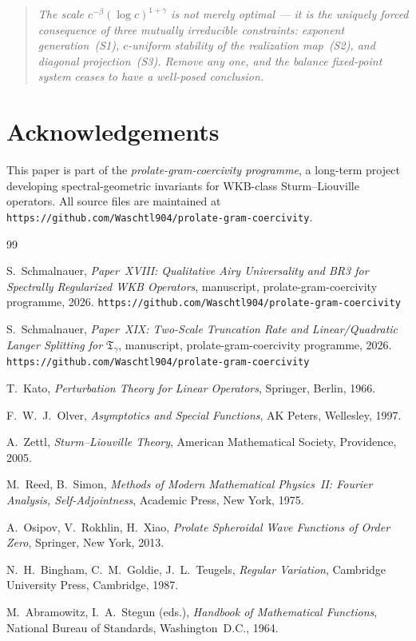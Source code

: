 \documentclass[12pt,a4paper]{amsart}
\theoremstyle{definition}
\begin{document}
\bigskip
\begin{quote}\itshape\large
The scale $c^{-\beta}(\log c)^{1+\gamma}$ is not merely optimal ---
it is the uniquely forced consequence of three mutually irreducible
constraints: exponent generation~(S1),
$c$-uniform stability of the realization map~(S2),
and diagonal projection~(S3).
Remove any one, and the balance fixed-point system
ceases to have a well-posed conclusion.
\end{quote}

\section*{Acknowledgements}

This paper is part of the \textit{prolate-gram-coercivity programme},
a long-term project developing spectral-geometric invariants
for WKB-class Sturm--Liouville operators.
All source files are maintained at
\texttt{https://github.com/Waschtl904/prolate-gram-coercivity}.

\begin{thebibliography}{99}

S.~Schmalnauer,
\textit{Paper~XVIII: Qualitative Airy Universality and BR3 for
Spectrally Regularized WKB Operators},
manuscript, prolate-gram-coercivity programme, 2026.
\texttt{https://github.com/Waschtl904/prolate-gram-coercivity}

S.~Schmalnauer,
\textit{Paper~XIX: Two-Scale Truncation Rate and Linear/Quadratic
Langer Splitting for $\mathfrak{T}_\gamma$},
manuscript, prolate-gram-coercivity programme, 2026.
\texttt{https://github.com/Waschtl904/prolate-gram-coercivity}

T.~Kato,
\textit{Perturbation Theory for Linear Operators},
Springer, Berlin, 1966.

F.~W.~J.~Olver,
\textit{Asymptotics and Special Functions},
AK Peters, Wellesley, 1997.

A.~Zettl,
\textit{Sturm--Liouville Theory},
American Mathematical Society, Providence, 2005.

M.~Reed, B.~Simon,
\textit{Methods of Modern Mathematical Physics~II: Fourier Analysis,
Self-Adjointness},
Academic Press, New York, 1975.

A.~Osipov, V.~Rokhlin, H.~Xiao,
\textit{Prolate Spheroidal Wave Functions of Order Zero},
Springer, New York, 2013.

N.~H.~Bingham, C.~M.~Goldie, J.~L.~Teugels,
\textit{Regular Variation},
Cambridge University Press, Cambridge, 1987.

M.~Abramowitz, I.~A.~Stegun (eds.),
\textit{Handbook of Mathematical Functions},
National Bureau of Standards, Washington~D.C., 1964.

\end{thebibliography}
\end{document}

